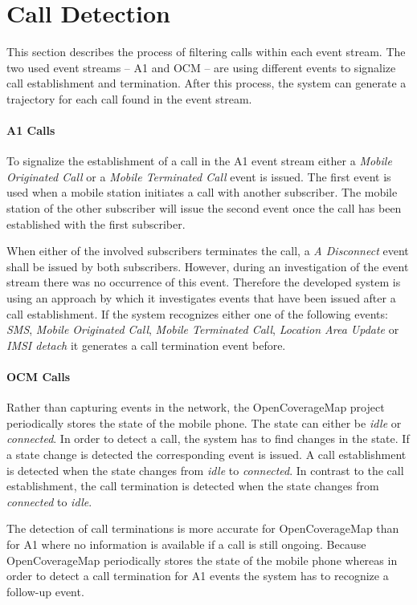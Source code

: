 \section{Call Detection}
This section describes the process of filtering calls within each event stream. The two used event streams -- A1 and OCM -- are using different events to signalize call establishment and termination. After this process, the system can generate a trajectory for each call found in the event stream.
\paragraph{A1 Calls}
To signalize the establishment of a call in the A1 event stream either a \emph{Mobile Originated Call} or a \emph{Mobile Terminated Call} event is issued. The first event is used when a mobile station initiates a call with another subscriber. The mobile station of the other subscriber will issue the second event once the call has been established with the first subscriber.

When either of the involved subscribers terminates the call, a \emph{A Disconnect} event shall be issued by both subscribers. However, during an investigation of the event stream there was no occurrence of this event. Therefore the developed system is using an approach by which it investigates events that have been issued after a call establishment. If the system recognizes either one of the following events: \emph{SMS}, \emph{Mobile Originated Call}, \emph{Mobile Terminated Call}, \emph{Location Area Update} or \emph{IMSI detach} it generates a call termination event before.

\paragraph{OCM Calls}
Rather than capturing events in the network, the OpenCoverageMap project periodically stores the state of the mobile phone. The state can either be \emph{idle} or \emph{connected}. In order to detect a call, the system has to find changes in the state. If a state change is detected the corresponding event is issued. A call establishment is detected when the state changes from \emph{idle} to \emph{connected}. In contrast to the call establishment, the call termination is detected when the state changes from \emph{connected} to \emph{idle}.

The detection of call terminations is more accurate for OpenCoverageMap than for A1 where no information is available if a call is still ongoing. Because OpenCoverageMap periodically stores the state of the mobile phone whereas in order to detect a call termination for A1 events the system has to recognize a follow-up event.

